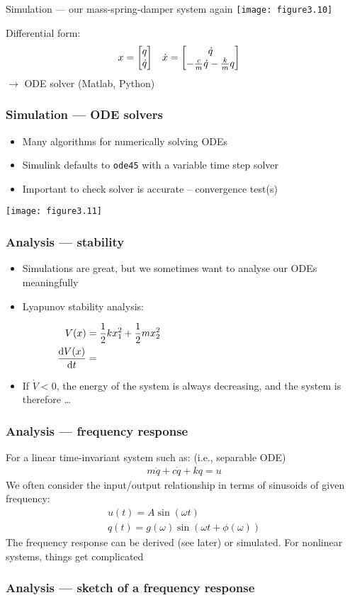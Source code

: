 \documentclass{beamer-control}
\begin{document}

\begin{frame}{Simulation --- our mass-spring-damper system again}
\texttt{[image: figure3.10]}

Differential form:
\begin{align}
x &= \begin{bmatrix}q\\\dot q\end{bmatrix} & \dot x & = \begin{bmatrix}\dot q\\- \frac cm\dot q - \frac km q\end{bmatrix}
\end{align}
$\to$ ODE solver (Matlab, Python)
\end{frame}

\begin{frame}
\frametitle{Simulation --- ODE solvers}
\begin{itemize}
\item Many algorithms for numerically solving ODEs
\item Simulink defaults to \texttt{ode45} with a variable time step solver
\item Important to check solver is accurate -- convergence test(s)
\end{itemize}
\texttt{[image: figure3.11]}
\end{frame}

\begin{frame}
\frametitle{Analysis --- stability}
\begin{itemize}
\item
Simulations are great, but we sometimes want to analyse our ODEs meaningfully
\item
Lyapunov stability analysis:
\end{itemize}
\begin{align}
V(x) &= \frac12kx_1^2 + \frac12mx_2^2 & \hspace{5cm}\\
\Deriv{V(x)}{t} &= 
\end{align}
\vfill
\vspace*{1cm}
\begin{itemize}
\item If $\dot V < 0$, the energy of the system is always decreasing, and the system is therefore \dots
\end{itemize}
\vspace*{-1cm}
\end{frame}

\begin{frame}
\frametitle{Analysis --- frequency response}
For a linear time-invariant system such as: (i.e., separable ODE)
\begin{gather}
m\ddot q + c\dot q + k q = u
\end{gather}
We often consider the input/output relationship in terms of sinusoids of given frequency:
\begin{gather}
u(t) = A\sin(\omega t) \\
q(t) = g(\omega)\sin(\omega t + \phi(\omega))
\end{gather}
The frequency response can be derived (see later) or simulated. For nonlinear systems, things get complicated
\end{frame}

\begin{frame}
\frametitle{Analysis --- sketch of a frequency response}
\end{frame}


\SUMMARYFRAME
\FINALE
\end{document}

